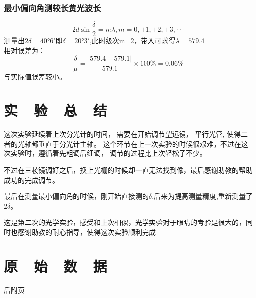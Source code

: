 \documentclass{thuemp}
\begin{document}
\subsubsection{最小偏向角测较长黄光波长}
$$2 d \sin \frac{\delta}{2} = m\lambda , m=0,\pm1,\pm2,\pm3,···$$
测量出$2\delta = 40°6'$即$\delta = 20°3'$,此时级次m=2，带入可求得$\lambda = 579.4$
\\相对误差为：
$$\frac{\delta}{\mu}=\frac{|579.4-579.1|}{579.1}\times 100\%= 0.06\%$$与实际值误差较小。
\section{实~~验~~总~~结}
这次实验延续着上次分光计的时间，
需要在开始调节望远镜，
平行光管,
使得二者的光轴都垂直于分光计主轴。
这个环节在上一次实验的时候很艰难，不过在这次实验时，遵循着先粗调后细调，
调节的过程比上次轻松了不少。

不过在三棱镜调好之后，换上光栅的时候却一直无法找到像，最后感谢助教的帮助成功的完成调节。

最后在测量最小偏向角的时候，刚开始直接测的$\delta$,后来为提高测量精度,重新测量了$2\delta$。

这是第二次的光学实验，感受和上次相似，光学实验对于眼睛的考验是很大的，同时也感谢助教的耐心指导，使得这次实验顺利完成
\section*{原~~始~~数~~据}
后附页
\newpage



















\newpage

\renewcommand\refname{\heiti\wuhao\centerline{参考文献}\global\def\refname{参考文献}}
\vskip 12pt

\let\OLDthebibliography\thebibliography
\renewcommand\thebibliography[1]{
  \OLDthebibliography{#1}
  \setlength{\parskip}{0pt}
  \setlength{\itemsep}{0pt plus 0.3ex}
}

{
\renewcommand{\baselinestretch}{0.9}
\liuhao


}
\end{document}
